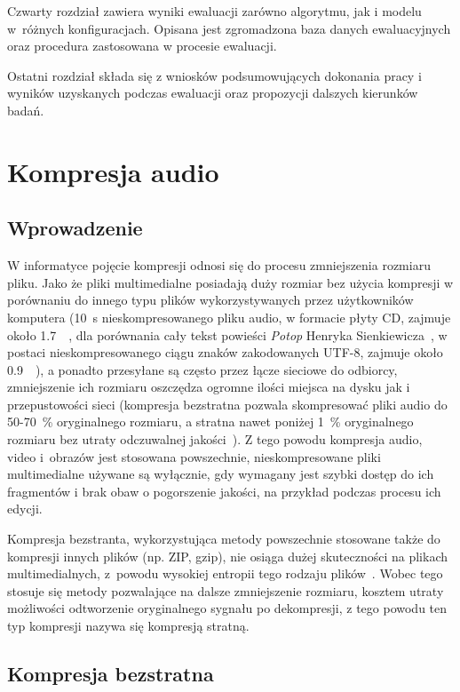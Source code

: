 \documentclass[pl,12pt]{aghdpl}
\let\Oldchapter\chapter%
\renewcommand{\chapter}{\FloatBarrier\Oldchapter}
\let\Oldsection\section%
\renewcommand{\section}{\FloatBarrier\Oldsection}
\begin{document}
Czwarty rozdział zawiera wyniki ewaluacji zarówno algorytmu, jak i modelu
w~różnych konfiguracjach. Opisana jest zgromadzona baza danych ewaluacyjnych oraz
procedura zastosowana w procesie ewaluacji.

Ostatni rozdział składa się z wniosków podsumowujących dokonania pracy i
wyników uzyskanych podczas ewaluacji oraz propozycji dalszych kierunków badań.

\chapter{Kompresja audio}
\section{Wprowadzenie}
W informatyce pojęcie kompresji odnosi się do procesu zmniejszenia rozmiaru
pliku. Jako że pliki multimedialne posiadają duży rozmiar bez użycia kompresji
w porównaniu do innego typu plików wykorzystywanych przez użytkowników
komputera (\SI{10}{\second} nieskompresowanego pliku audio, w formacie płyty
CD, zajmuje około \SI{1.7}{\mebi\byte}, dla porównania cały tekst powieści
\textit{Potop} Henryka Sienkiewicza~\cite{Sienkiewicz2010}, w postaci
nieskompresowanego ciągu znaków zakodowanych UTF-8, zajmuje około
\SI{0.9}{\mebi\byte}), a ponadto przesyłane są często przez łącze sieciowe do
odbiorcy, zmniejszenie ich rozmiaru oszczędza ogromne ilości miejsca na dysku
jak i przepustowości sieci (kompresja bezstratna pozwala skompresować pliki
audio do \num{50}-\SI{70}{\percent} oryginalnego rozmiaru, a stratna nawet
poniżej \SI{1}{\percent} oryginalnego rozmiaru bez utraty odczuwalnej
jakości~\cite{Beurden2015, kamedo22014}). Z tego powodu kompresja audio, video
i~obrazów jest stosowana powszechnie, nieskompresowane pliki multimedialne
używane są wyłącznie, gdy wymagany jest szybki dostęp do ich fragmentów i brak
obaw o pogorszenie jakości, na przykład podczas procesu ich edycji.

Kompresja bezstranta, wykorzystująca metody powszechnie stosowane także do
kompresji innych plików (np. ZIP, gzip), nie osiąga dużej skuteczności na
plikach multimedialnych, z~powodu wysokiej entropii tego rodzaju
plików~\cite{Sayood2002}. Wobec tego stosuje się metody pozwalające na dalsze
zmniejszenie rozmiaru, kosztem utraty możliwości odtworzenie oryginalnego
sygnału po dekompresji, z tego powodu ten typ kompresji nazywa się kompresją
stratną.

\section{Kompresja bezstratna}
\end{document}
